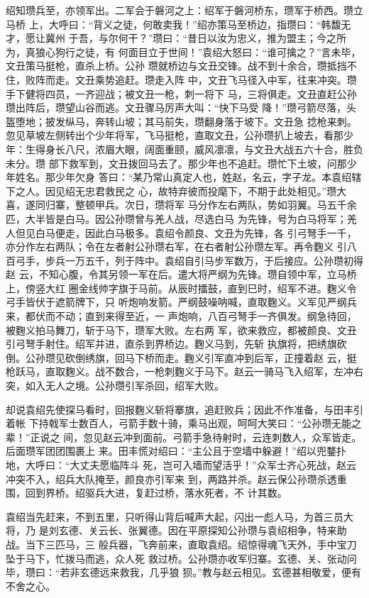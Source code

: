绍知瓒兵至，亦领军出。二军会于磐河之上：绍军于磐河桥东，瓒军于桥西。瓒立马桥
上，大呼曰：“背义之徒，何敢卖我！”绍亦策马至桥边，指瓒曰：“韩馥无才，愿让冀州
于吾，与尔何干？”瓒曰：“昔日以汝为忠义，推为盟主；今之所为，真狼心狗行之徒，有
何面目立于世间！”袁绍大怒曰：“谁可擒之？”言未毕，文丑策马挺枪，直杀上桥。公孙
瓒就桥边与文丑交锋。战不到十余合，瓒抵挡不住，败阵而走。文丑乘势追赶。瓒走入阵
中，文丑飞马径入中军，往来冲突。瓒手下健将四员，一齐迎战；被文丑一枪，刺一将下
马，三将俱走。文丑直赶公孙瓒出阵后，瓒望山谷而逃。文丑骤马厉声大叫：“快下马受
降！”瓒弓箭尽落，头盔堕地；披发纵马，奔转山坡；其马前失，瓒翻身落于坡下。文丑急
捻枪来刺。忽见草坡左侧转出个少年将军，飞马挺枪，直取文丑，公孙瓒扒上坡去，看那少
年：生得身长八尺，浓眉大眼，阔面重颐，威风凛凛，与文丑大战五六十合，胜负未分。瓒
部下救军到，文丑拨回马去了。那少年也不追赶。瓒忙下土坡，问那少年姓名。那少年欠身
答曰：“某乃常山真定人也，姓赵，名云，字子龙。本袁绍辖下之人。因见绍无忠君救民之
心，故特弃彼而投麾下，不期于此处相见。”瓒大喜，遂同归寨，整顿甲兵。次日，瓒将军
马分作左右两队，势如羽翼。马五千余匹，大半皆是白马。因公孙瓒曾与羌人战，尽选白马
为先锋，号为白马将军；羌人但见白马便走，因此白马极多。袁绍令颜良、文丑为先锋，各
引弓弩手一千，亦分作左右两队；令在左者射公孙瓒右军，在右者射公孙瓒左军。再令麴义
引八百弓手，步兵一万五千，列于阵中。袁绍自引马步军数万，于后接应。公孙瓒初得赵
云，不知心腹，令其另领一军在后。遣大将严纲为先锋。瓒自领中军，立马桥上，傍竖大红
圈金线帅字旗于马前。从辰时擂鼓，直到巳时，绍军不进。麴义令弓手皆伏于遮箭牌下，只
听炮响发箭。严纲鼓噪呐喊，直取麴义。义军见严纲兵来，都伏而不动；直到来得至近，一
声炮响，八百弓弩手一齐俱发。纲急待回，被麴义拍马舞刀，斩于马下，瓒军大败。左右两
军，欲来救应，都被颜良、文丑引弓弩手射住。绍军并进，直杀到界桥边。麴义马到，先斩
执旗将，把绣旗砍倒。公孙瓒见砍倒绣旗，回马下桥而走。麴义引军直冲到后军，正撞着赵
云，挺枪跃马，直取麴义。战不数合，一枪刺麴义于马下。赵云一骑马飞入绍军，左冲右
突，如入无人之境。公孙瓒引军杀回，绍军大败。

却说袁绍先使探马看时，回报麴义斩将搴旗，追赶败兵；因此不作准备，与田丰引着帐
下持戟军士数百人，弓箭手数十骑，乘马出观，呵呵大笑曰：“公孙瓒无能之辈！”正说之
间，忽见赵云冲到面前。弓箭手急待射时，云连刺数人，众军皆走。后面瓒军团团围裹上
来。田丰慌对绍曰：“主公且于空墙中躲避！”绍以兜鍪扑地，大呼曰：“大丈夫愿临阵斗
死，岂可入墙而望活乎！”众军士齐心死战，赵云冲突不入，绍兵大队掩至，颜良亦引军来
到，两路并杀。赵云保公孙瓒杀透重围，回到界桥。绍驱兵大进，复赶过桥，落水死者，不
计其数。

袁绍当先赶来，不到五里，只听得山背后喊声大起，闪出一彪人马，为首三员大将，乃
是刘玄德、关云长、张翼德。因在平原探知公孙瓒与袁绍相争，特来助战。当下三匹马，三
般兵器，飞奔前来，直取袁绍。绍惊得魂飞天外，手中宝刀坠于马下，忙拨马而逃，众人死
救过桥。公孙瓒亦收军归寨。玄德、关、张动问毕，瓒曰：“若非玄德远来救我，几乎狼
狈。”教与赵云相见。玄德甚相敬爱，便有不舍之心。


